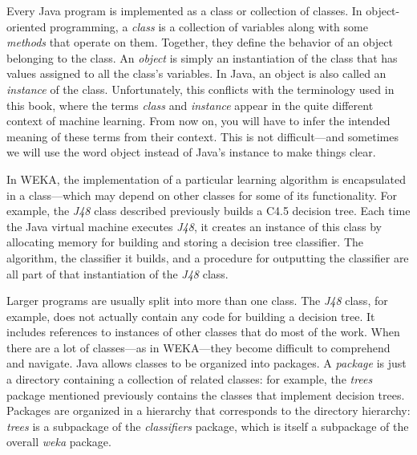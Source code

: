 Every Java program is implemented as a class or collection of
classes. In object-oriented programming, a \textit{class} is a
collection of variables along with some \textit{methods} that operate
on them. Together, they define the behavior of an object belonging to
the class. An \textit{object} is simply an instantiation of the class
that has values assigned to all the class's variables. In Java, an
object is also called an \textit{instance} of the
class. Unfortunately, this conflicts with the terminology used in this
book, where the terms \textit{class} and \textit{instance} appear in
the quite different context of machine learning. From now on, you will
have to infer the intended meaning of these terms from their
context. This is not difficult---and sometimes we will use the word object
instead of Java's instance to make things clear.

In WEKA, the implementation of a particular learning algorithm is
encapsulated in a class---which may depend on other classes for some
of its functionality. For example, the \textit{J48} class described
previously builds a C4.5 decision tree. Each time the Java virtual
machine executes \textit{J48}, it creates an instance of this class by
allocating memory for building and storing a decision tree
classifier. The algorithm, the classifier it builds, and a procedure
for outputting the classifier are all part of that instantiation of
the \textit{J48} class.

Larger programs are usually split into more than one class. The
\textit{J48} class, for example, does not actually contain any code
for building a decision tree. It includes references to instances of
other classes that do most of the work. When there are a lot of
classes---as in WEKA---they become difficult to comprehend and
navigate. Java allows classes to be organized into packages. A
\textit{package} is just a directory containing a collection of
related classes: for example, the \textit{trees} package mentioned
previously contains the classes that implement decision
trees. Packages are organized in a hierarchy that corresponds to the
directory hierarchy: \textit{trees} is a subpackage of the
\textit{classifiers} package, which is itself a subpackage of the
overall \textit{weka} package.

